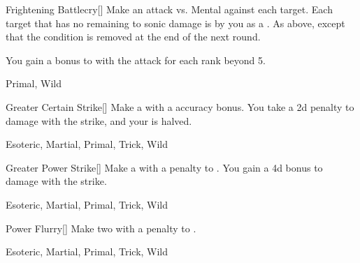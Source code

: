 \lowercase{\hypertarget{maneuver:Frightening Battlecry}{}}\label{maneuver:Frightening Battlecry}
\hypertarget{maneuver:Frightening Battlecry}{}
\begin{freeability}[Rank 5]{Frightening Battlecry}[]
Make an attack vs. Mental against each target.
\hit Each target that has no remaining  to sonic damage is  by you as a .
\glance As above, except that the condition is removed at the end of the next round.

\rankline
You gain a  bonus to  with the attack for each rank beyond 5.


 Primal, Wild
\end{freeability}
\vspace{0.25em}



\lowercase{\hypertarget{maneuver:Greater Certain Strike}{}}\label{maneuver:Greater Certain Strike}
\hypertarget{maneuver:Greater Certain Strike}{}
\begin{freeability}[Rank 5]{Greater Certain Strike}[]
Make a  with a  accuracy bonus.
You take a \minus2d penalty to damage with the strike, and your  is halved.


 Esoteric, Martial, Primal, Trick, Wild
\end{freeability}
\vspace{0.25em}



\lowercase{\hypertarget{maneuver:Greater Power Strike}{}}\label{maneuver:Greater Power Strike}
\hypertarget{maneuver:Greater Power Strike}{}
\begin{freeability}[Rank 5]{Greater Power Strike}[]
Make a  with a  penalty to .
You gain a \plus4d bonus to damage with the strike.


 Esoteric, Martial, Primal, Trick, Wild
\end{freeability}
\vspace{0.25em}



\lowercase{\hypertarget{maneuver:Power Flurry}{}}\label{maneuver:Power Flurry}
\hypertarget{maneuver:Power Flurry}{}
\begin{freeability}[Rank 5]{Power Flurry}[]
Make two  with a  penalty to .


 Esoteric, Martial, Primal, Trick, Wild
\end{freeability}
\vspace{0.25em}



